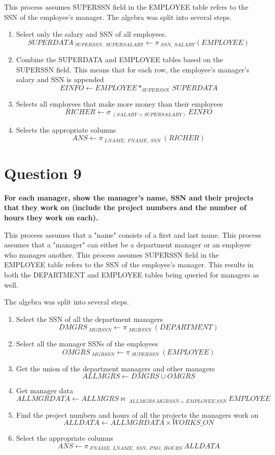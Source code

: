 \documentclass{article}
\begin{document}
    This process assumes SUPERSSN field in the EMPLOYEE table refers to the SSN of the employee's manager. The algebra was split into several steps.

    \begin{enumerate}
        \item Select only the salary and SSN of all employees.
        \[ SUPERDATA \: _{SUPERSSN, \: SUPERSALARY} \gets \pi \: _{SSN, \: SALARY} (EMPLOYEE) \]
        \item Combine the SUPERDATA and EMPLOYEE tables based on the SUPERSSN field. This means that for each row, the employee's manager's salary and SSN is appended
        \[ EINFO \gets EMPLOYEE * _{SUPERSSN} \: SUPERDATA \]
        \item Selects all employees that make more money than their employees
        \[ RICHER \gets \sigma \: _{(SALARY > SUPERSALARY)} \: EINFO\]
        \item Selects the appropriate columns
        \[ ANS \gets \pi \: _{LNAME, \: FNAME, \: SSN} \: (RICHER) \]
    \end{enumerate}

\section{Question 9}

    \textbf{For each manager, show the manager's name, SSN and their projects that they work on (include the project numbers and the number of hours they work on each).}
    
    This process assumes that a "name" consists of a first and last name. This process assumes that a "manager" can either be a department manager or an employee who manages another. This process assumes SUPERSSN field in the EMPLOYEE table refers to the SSN of the employee's manager. This results in both the DEPARTMENT and EMPLOYEE tables being queried for managers as well. 
    
    The algebra was split into several steps.

    \begin{enumerate}
        \item Select the SSN of all the department managers
        \[ DMGRS \: _{MGRSSN} \gets \pi \: _{MGRSSN} \: (DEPARTMENT) \]
        \item Select all the manager SSNs of the employees
        \[ OMGRS \: _{MGRSSN} \gets \pi \: _{SUPERSSN} \: (EMPLOYEE) \]
        \item Get the union of the department managers and other managers
        \[ ALLMGRS \gets DMGRS \cup OMGRS \]
        \item Get manager data
        \[ALLMGRDATA \gets ALLMGRS \bowtie \: _{ALLMGRS.MGRSSN=EMPLOYEE.SSN} \: EMPLOYEE \]
        \item Find the project numbers and hours of all the projects the managers work on
        \[ ALLDATA \gets ALLMGRDATA \times WORKS\_ON \]
        \item Select the appropriate columns
        \[ ANS \gets \pi \: _{FNAME, \: LNAME, \: SSN, \: PNO, \: HOURS} \: ALLDATA \]

    \end{enumerate}
\end{document}
